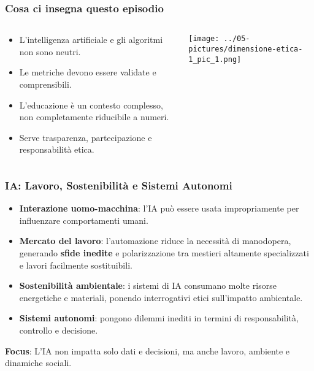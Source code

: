 \documentclass{beamer}
\begin{document}
%
%
\begin{frame}
\frametitle{Cosa ci insegna questo episodio}
\begin{columns}[T] %
\begin{column}{.48\textwidth}
        \begin{itemize}
  \item L'intelligenza artificiale e gli algoritmi non sono neutri.
  \item Le metriche devono essere validate e comprensibili.
  \item L'educazione \`e un contesto complesso, non completamente riducibile a numeri.
  \item Serve trasparenza, partecipazione e responsabilit\`a etica.
        \end{itemize}
\end{column}%
\hfill%
\begin{column}{.48\textwidth}
        \texttt{[image: ../05-pictures/dimensione-etica-1\_pic\_1.png]}
\end{column}%
\end{columns}
\end{frame}
%
%
\begin{frame}
\frametitle{IA: Lavoro, Sostenibilità e Sistemi Autonomi}

\begin{itemize}
    \item \textbf{Interazione uomo-macchina}: l'IA può essere usata impropriamente per influenzare comportamenti umani.
    \item \textbf{Mercato del lavoro}: l’automazione riduce la necessità di manodopera, generando \textbf{sfide inedite} e polarizzazione tra mestieri altamente specializzati e lavori facilmente sostituibili.
    \item \textbf{Sostenibilità ambientale}: i sistemi di IA consumano molte risorse energetiche e materiali, ponendo interrogativi etici sull’impatto ambientale.
    \item \textbf{Sistemi autonomi}: pongono dilemmi inediti in termini di responsabilità, controllo e decisione.
\end{itemize}

\vspace{0.3cm}
{\small
\textbf{Focus}: L’IA non impatta solo dati e decisioni, ma anche lavoro, ambiente e dinamiche sociali.
}

\end{frame}
\end{document}
